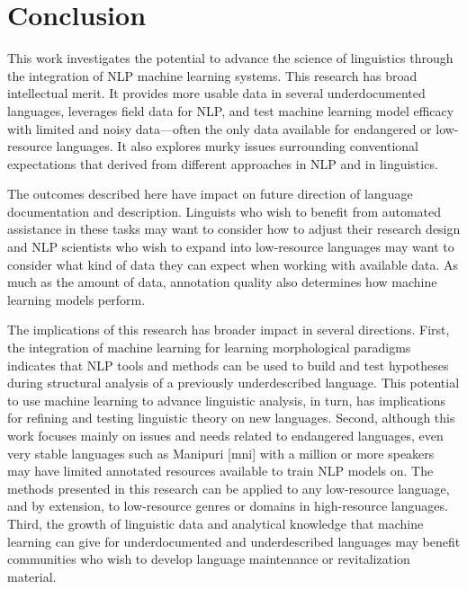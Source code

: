 \chapter{Conclusion}
\label{chap:conclusion}

This work investigates the potential to advance the science of linguistics through the integration of NLP machine learning systems. This research has broad intellectual merit. It provides more usable data in several underdocumented languages, leverages field data for NLP, and test machine learning model efficacy with limited and noisy data---often the only data available for endangered or low-resource languages. It also explores murky issues surrounding conventional expectations that derived from different approaches in NLP and in linguistics.

The outcomes described here have impact on future direction of language documentation and description. Linguists who wish to benefit from automated assistance in these tasks may want to consider how to adjust their research design and NLP scientists who wish to expand into low-resource languages may want to consider what kind of data they can expect when working with available data. As much as the amount of data, annotation quality also determines how machine learning models perform.

The implications of this research has broader impact in several directions. First, the integration of machine learning for learning morphological paradigms indicates that NLP tools and methods can be used to build and test hypotheses during structural analysis of a previously underdescribed language. This potential to use machine learning to advance linguistic analysis, in turn, has implications for refining and testing linguistic theory on new languages. Second, although this work focuses mainly on issues and needs related to endangered languages, even very stable languages such as Manipuri [mni] with a million or more speakers may have limited annotated resources available to train NLP models on. The methods presented in this research can be applied to any low-resource language, and by extension, to low-resource genres or domains in high-resource languages. Third, the growth of linguistic data and analytical knowledge that machine learning can give for underdocumented and underdescribed languages may benefit communities who wish to develop language maintenance or revitalization material. 



